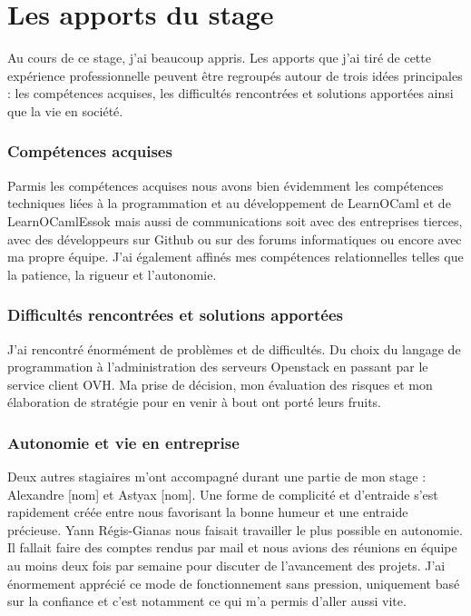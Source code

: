 \documentclass{article}
\begin{document}
\newpage

\section{Les apports du stage}
Au cours de ce stage, j’ai beaucoup appris. Les apports que j’ai tiré de cette expérience professionnelle peuvent être regroupés autour de trois idées principales : les compétences acquises, les difficultés rencontrées et solutions apportées ainsi que la vie en société.
\subsubsection{Compétences acquises}

Parmis les compétences acquises nous avons bien évidemment les compétences techniques liées à la programmation et au développement de LearnOCaml et de LearnOCamlEssok mais aussi de communications soit avec des entreprises tierces, avec des développeurs sur Github ou sur des forums informatiques ou encore avec ma propre équipe.
\newline
J'ai également affinés mes compétences relationnelles telles que la patience, la rigueur et l'autonomie.

\subsubsection{Difficultés rencontrées et solutions apportées}

J'ai rencontré énormément de problèmes et de difficultés. Du choix du langage de programmation à l'administration des serveurs Openstack en passant par le service client OVH.
\newline
Ma prise de décision, mon évaluation des risques et mon élaboration de stratégie pour en venir à bout ont porté leurs fruits.

\subsubsection{Autonomie et vie en entreprise}

Deux autres stagiaires m'ont accompagné durant une partie de mon stage : Alexandre [nom] et Astyax [nom].
\newline
Une forme de complicité et d'entraide s'est rapidement créée entre nous favorisant la bonne humeur et une entraide précieuse.
\newline
Yann Régis-Gianas nous faisait travailler le plus possible en autonomie. Il fallait faire des comptes rendus par mail et nous avions des réunions en équipe au moins deux fois par semaine pour discuter de l'avancement des projets.
\newline
J'ai énormement apprécié ce mode de fonctionnement sans pression, uniquement basé sur la confiance et c'est notamment ce qui m'a permis d'aller aussi vite.
\end{document}

